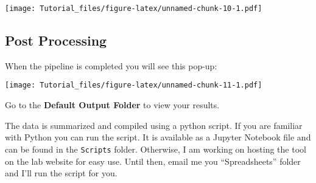 \documentclass[
]{article}
\begin{document}
\texttt{[image: Tutorial\_files/figure-latex/unnamed-chunk-10-1.pdf]}

\hypertarget{post-processing}{%
\subsection{Post Processing}\label{post-processing}}

When the pipeline is completed you will see this pop-up:

\texttt{[image: Tutorial\_files/figure-latex/unnamed-chunk-11-1.pdf]}

Go to the \textbf{Default Output Folder} to view your results.

The data is summarized and compiled using a python script. If you are
familiar with Python you can run the script. It is available as a
Jupyter Notebook file and can be found in the \texttt{Scripts} folder.
Otherwise, I am working on hosting the tool on the lab website for easy
use. Until then, email me you ``Spreadsheets'' folder and I'll run the
script for you.
\end{document}
